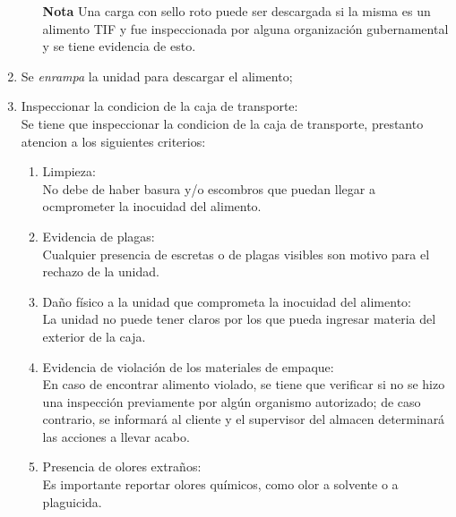 \begin{enumerate}
        \begin{itemize}
            \item[\textbf{Nota}] Una carga con sello roto puede ser descargada si la misma es un alimento TIF y fue inspeccionada por alguna organización gubernamental y se tiene evidencia de esto.
        \end{itemize}

    \item Se \textit{enrampa} la unidad para descargar el alimento;
    
    \item Inspeccionar la condicion de la caja de transporte:\\
    Se tiene que inspeccionar la condicion de la caja de transporte, prestanto atencion a los siguientes criterios:
    \begin{enumerate}
        \item Limpieza:\\    
        No debe de haber basura y/o escombros que puedan llegar a ocmprometer la inocuidad del alimento.

        \item Evidencia de plagas:\\
        Cualquier presencia de escretas o de plagas visibles son motivo para el rechazo de la unidad.
        
        \item Daño físico a la unidad que comprometa la inocuidad del alimento:\\
        La unidad no puede tener claros por los que pueda ingresar materia del exterior de la caja.

        \item Evidencia de violación de los materiales de empaque:\\
        En caso de encontrar alimento violado, se tiene que verificar si no se hizo una inspección previamente por algún organismo autorizado; de caso contrario, se informará al cliente y el supervisor del almacen determinará las acciones a llevar acabo. 

        \item Presencia de olores extraños:\\
        Es importante reportar olores químicos, como olor a solvente o a plaguicida.
    \end{enumerate}
\end{enumerate}

